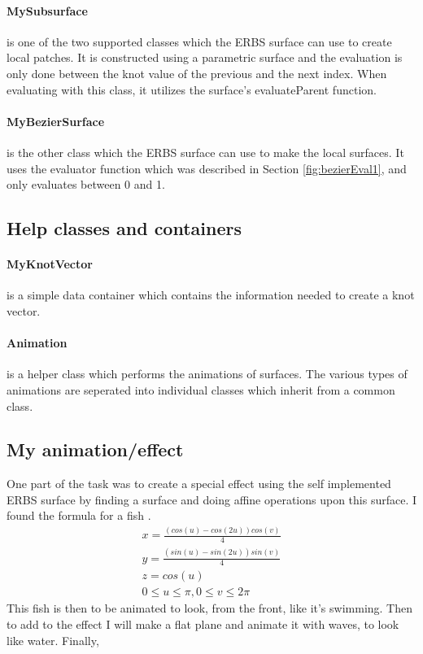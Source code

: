 \documentclass[a4paper,11pt]{article}
\begin{document}
\paragraph{MySubsurface}
is one of the two supported classes which the ERBS surface can use to create local patches. It is constructed using a parametric surface and the evaluation is only done between the knot value of the previous and the next index. When evaluating with this class, it utilizes the surface's evaluateParent function. 

\paragraph{MyBezierSurface}
is the other class which the ERBS surface can use to make the local surfaces. It uses the evaluator function which was described in Section \ref{fig:bezierEval1}, and only evaluates between 0 and 1. 

\subsection{Help classes and containers}
\paragraph{MyKnotVector}
is a simple data container which contains the information needed to create a knot vector. 

\paragraph{Animation}
is a helper class which performs the animations of surfaces. The various types of animations are seperated into individual classes which inherit from a common class. 

\subsection{My animation/effect}
One part of the task was to create a special effect using the self implemented ERBS surface by finding a surface and doing affine operations upon this surface. I found the formula for a fish \cite{web_fish}.
\begin{equation}
\begin{split}
 x = \frac{(cos(u) - cos(2u))cos(v)}{4} \\
 y = \frac{(sin(u) - sin(2u))sin(v)}{4} \\
 z = cos(u) \\
 0 \leq u \leq \pi, 0 \leq v \leq 2\pi
\end{split}
\end{equation}
This fish is then to be animated to look, from the front, like it's swimming. Then to add to the effect I will make a flat plane and animate it with waves, to look like water. Finally, 
\end{document}
